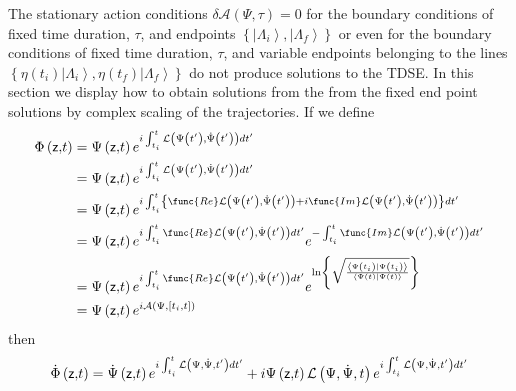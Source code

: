 \documentclass[aps,preprint]{revtex4}
\begin{document}
The stationary action conditions $\delta\mathcal{A}\left( \Psi,\tau\right)
=0 $ for the boundary conditions of fixed time duration, $\tau$, and
endpoints $\left\{ \left| \Lambda_{i}\right\rangle ,\left|
\Lambda_{f}\right\rangle \right\} $ or even for the boundary conditions of
fixed time duration, $\tau $, and variable endpoints belonging to the lines $%
\left\{ \eta\left( t_{i}\right) \left| \Lambda_{i}\right\rangle ,\eta\left(
t_{f}\right) \left| \Lambda_{f}\right\rangle \right\} $ do not produce
solutions to the TDSE. In this section we display how to obtain solutions
from the from the fixed end point solutions by complex scaling of the
trajectories. If we define 
\begin{align}
\Phi\left( \mathsf{z,}t\right) & =\Psi\left( \mathsf{z,}t\right)
e^{i\int_{t_{i}}^{t}\mathcal{L}\left( \Psi\left( t^{\prime}\right) ,\dot{\Psi%
}\left( t^{\prime}\right) \right) dt^{\prime}}  \notag \\
& =\Psi\left( \mathsf{z,}t\right) e^{i\int_{t_{i}}^{t}\mathcal{L}\left(
\Psi\left( t^{\prime}\right) ,\dot{\Psi}\left( t^{\prime}\right) \right)
dt^{\prime}}  \notag \\
& =\Psi\left( \mathsf{z,}t\right) e^{i\int_{t_{i}}^{t}\left\{ \func{Re}%
\mathcal{L}\left( \Psi\left( t^{\prime}\right) ,\dot{\Psi }\left(
t^{\prime}\right) \right) +i\func{Im}\mathcal{L}\left( \Psi\left(
t^{\prime}\right) ,\dot{\Psi}\left( t^{\prime}\right) \right) \right\}
dt^{\prime}}  \notag \\
& =\Psi\left( \mathsf{z,}t\right) e^{i\int_{t_{i}}^{t}\func{Re}\mathcal{L}%
\left( \Psi\left( t^{\prime}\right) ,\dot{\Psi}\left( t^{\prime}\right)
\right) dt^{\prime}}e^{-\int_{t_{i}}^{t}\func{Im}\mathcal{L}\left(
\Psi\left( t^{\prime}\right) ,\dot{\Psi}\left( t^{\prime}\right) \right)
dt^{\prime}}  \notag \\
& =\Psi\left( \mathsf{z,}t\right) e^{i\int_{t_{i}}^{t}\func{Re}\mathcal{L}%
\left( \Psi\left( t^{\prime}\right) ,\dot{\Psi}\left( t^{\prime}\right)
\right) dt^{\prime}}e^{\ln\left\{ \sqrt{\frac {\left\langle \Psi\left(
t_{i}\right) |\Psi\left( t_{i}\right) \right\rangle }{\left\langle
\Psi\left( t\right) |\Psi\left( t\right) \right\rangle }}\right\} }  \notag
\\
& =\Psi\left( \mathsf{z,}t\right) e^{i\mathcal{A}\left( \Psi,\left[ t_{i},t%
\right] \right) }
\end{align}
then 
\begin{equation}
\dot{\Phi}\left( \mathsf{z,}t\right) =\dot{\Psi}\left( \mathsf{z,}t\right)
e^{i\int_{t_{i}}^{t}\mathcal{L}\left( \Psi,\dot{\Psi},t^{\prime}\right)
dt^{\prime}}+i\Psi\left( \mathsf{z,}t\right) \mathcal{L}\left( \Psi ,\dot{%
\Psi},t\right) e^{i\int_{t_{i}}^{t}\mathcal{L}\left( \Psi,\dot{\Psi }%
,t^{\prime}\right) dt^{\prime}}
\end{equation}
\end{document}
